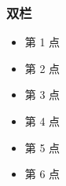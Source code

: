 \documentclass{beamer}
\begin{document}
\begin{CJK}{UTF8}{hei}

    \begin{frame}
        \frametitle{双栏}
        \begin{multicols}{2}
            \begin{itemize}
                \item 第 1 点
                \item 第 2 点
                \item 第 3 点
                \item 第 4 点
                \item 第 5 点
                \item 第 6 点
            \end{itemize}
        \end{multicols}
    \end{frame}

\end{CJK}
\end{document}
